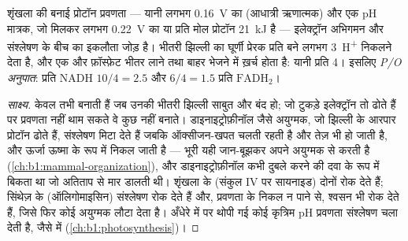 \begin{theorem}[रसोपरासरणी युग्मन]\label{thm:b1:respiration-fermentation:chemiosmosis}
शृंखला की बनाई प्रोटॉन प्रवणता --- यानी लगभग \qty{0.16}{V} का
 (आधात्री ऋणात्मक) और एक pH मात्रक, जो मिलकर लगभग
\qty{0.22}{V} का \emph{} या प्रति मोल प्रोटॉन
\qty{21}{kJ} है --- इलेक्ट्रॉन अभिगमन और  संश्लेषण के बीच का इकलौता
जोड़ है। भीतरी झिल्ली का घूर्णी प्रेरक  प्रति बने  लगभग
\qty{3}{H^+} निकलने देता है, और एक और फ़ॉस्फ़ेट भीतर लाने तथा  बाहर
भेजने में ख़र्च होता है: यानी प्रति  4। इसलिए
\emph{P/O अनुपात}: प्रति NADH $10/4 = 2.5$  और
$6/4 = 1.5$ प्रति $\mathrm{FADH_2}$।
\end{theorem}
\begin{proof}[साक्ष्य]
  केवल तभी बनाती हैं जब उनकी भीतरी झिल्ली साबुत और बंद
हो; जो टुकड़े इलेक्ट्रॉन तो ढोते हैं पर प्रवणता नहीं थाम सकते वे कुछ नहीं
बनाते। डाइनाइट्रोफ़ीनॉल जैसे अयुग्मक, जो झिल्ली के आरपार प्रोटॉन ढोते
हैं,  संश्लेषण मिटा देते हैं जबकि ऑक्सीजन-खपत चलती रहती है और तेज़ भी
हो जाती है, और ऊर्जा ऊष्मा के रूप में निकल जाती है --- भूरी  यही
जान-बूझकर अपने अयुग्मक  से करती है
(\cref{ch:b1:mammal-organization}), और डाइनाइट्रोफ़ीनॉल कभी दुबले करने
की दवा के रूप में बिकता था जो अतिताप से मार डालती थी। शृंखला के 
(संकुल IV पर सायनाइड) दोनों रोक देते हैं; सिंथेज़ के 
(ऑलिगोमाइसिन)  संश्लेषण रोक देते हैं और, प्रवणता के निकल न पाने से,
श्वसन भी रोक देते हैं, जिसे फिर कोई अयुग्मक लौटा देता है। अँधेरे में
 पर थोपी गई कोई कृत्रिम pH प्रवणता  संश्लेषण चला देती है,
जैसे  में (\cref{ch:b1:photosynthesis})।
\end{proof}

